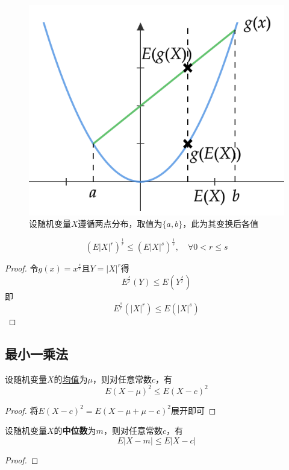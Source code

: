 \begin{figure}[h]
    \centering
    \includegraphics{image/trans_mean.png}
    \caption{设随机变量$X$遵循两点分布，取值为$\{ a,b \}$，此为其变换后各值}
\end{figure}

\begin{lemma}
    \[ (E|X|^r)^{\frac{1}{r}} \le (E|X|^s)^{\frac{1}{s}} ,\quad \forall 0<r \le s \]
\end{lemma}
\begin{proof}
    令$g(x)=x^{\frac{s}{r}}$且$Y=|X|^r$得
    \[ E^{\frac{s}{r}}(Y) \le E(Y^{\frac{s}{r}}) \]
    即
    \[ E^{\frac{s}{r}}(|X|^r) \le E(|X|^s) \]
\end{proof}

\subsection{最小一乘法}

\begin{proposition}
    设随机变量$X$的\underline{均值}为$\mu$，则对任意常数$c$，有
    \[ E(X-\mu)^2 \le E(X-c)^2 \]
\end{proposition}
\begin{proof}
    将$E(X-c)^2=E(X-\mu+\mu-c)^2$展开即可
\end{proof}

\begin{proposition}
    设随机变量$X$的\textbf{中位数}为$m$，则对任意常数$c$，有
    \[ E|X-m| \le E|X-c| \]
\end{proposition}
\begin{proof}
    
\end{proof}

